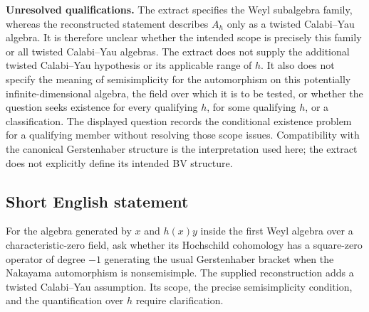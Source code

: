\documentclass[11pt]{article}
\begin{document}
\textbf{Unresolved qualifications.} The extract specifies the Weyl subalgebra family, whereas the reconstructed statement describes \(A_h\) only as a twisted Calabi--Yau algebra. It is therefore unclear whether the intended scope is precisely this family or all twisted Calabi--Yau algebras. The extract does not supply the additional twisted Calabi--Yau hypothesis or its applicable range of \(h\). It also does not specify the meaning of semisimplicity for the automorphism on this potentially infinite-dimensional algebra, the field over which it is to be tested, or whether the question seeks existence for every qualifying \(h\), for some qualifying \(h\), or a classification. The displayed question records the conditional existence problem for a qualifying member without resolving those scope issues. Compatibility with the canonical Gerstenhaber structure is the interpretation used here; the extract does not explicitly define its intended BV structure.
\subsection{Short English statement}
For the algebra generated by \(x\) and \(h(x)y\) inside the first Weyl algebra over a characteristic-zero field, ask whether its Hochschild cohomology has a square-zero operator of degree \(-1\) generating the usual Gerstenhaber bracket when the Nakayama automorphism is nonsemisimple. The supplied reconstruction adds a twisted Calabi--Yau assumption. Its scope, the precise semisimplicity condition, and the quantification over \(h\) require clarification.
\end{document}
